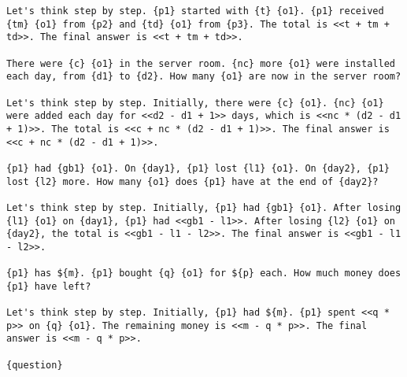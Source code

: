 \begin{lstlisting}[style=myGrammarStyle, caption=CoT Prompt Template For GSM-Symbolic Evaluation]
Let's think step by step. {p1} started with {t} {o1}. {p1} received {tm} {o1} from {p2} and {td} {o1} from {p3}. The total is <<t + tm + td>>. The final answer is <<t + tm + td>>.

There were {c} {o1} in the server room. {nc} more {o1} were installed each day, from {d1} to {d2}. How many {o1} are now in the server room?

Let's think step by step. Initially, there were {c} {o1}. {nc} {o1} were added each day for <<d2 - d1 + 1>> days, which is <<nc * (d2 - d1 + 1)>>. The total is <<c + nc * (d2 - d1 + 1)>>. The final answer is <<c + nc * (d2 - d1 + 1)>>.

{p1} had {gb1} {o1}. On {day1}, {p1} lost {l1} {o1}. On {day2}, {p1} lost {l2} more. How many {o1} does {p1} have at the end of {day2}?

Let's think step by step. Initially, {p1} had {gb1} {o1}. After losing {l1} {o1} on {day1}, {p1} had <<gb1 - l1>>. After losing {l2} {o1} on {day2}, the total is <<gb1 - l1 - l2>>. The final answer is <<gb1 - l1 - l2>>.

{p1} has ${m}. {p1} bought {q} {o1} for ${p} each. How much money does {p1} have left?

Let's think step by step. Initially, {p1} had ${m}. {p1} spent <<q * p>> on {q} {o1}. The remaining money is <<m - q * p>>. The final answer is <<m - q * p>>.

{question}
\end{lstlisting}
\label{gram:gsm_prompt}